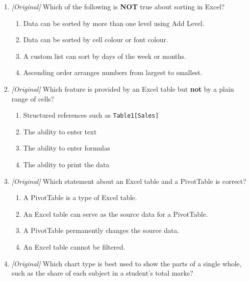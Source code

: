 \documentclass[11pt]{article}
\begin{document}
\begin{enumerate}[label=\textbf{Q\arabic*.}, leftmargin=*]
\begin{enumerate}[label=\Alph*.]
    \item permanently deleted from the worksheet
    \item temporarily hidden, but not deleted
    \item moved to a new worksheet
    \item converted into a PivotTable
  \end{enumerate}
\item \textit{[Original]} Which of the following is \textbf{NOT} true about
  sorting in Excel?
  \begin{enumerate}[label=\Alph*.]
    \item Data can be sorted by more than one level using Add Level.
    \item Data can be sorted by cell colour or font colour.
    \item A custom list can sort by days of the week or months.
    \item Ascending order arranges numbers from largest to smallest.
  \end{enumerate}
\item \textit{[Original]} Which feature is provided by an Excel table but
  \textbf{not} by a plain range of cells?
  \begin{enumerate}[label=\Alph*.]
    \item Structured references such as \texttt{Table1[Sales]}
    \item The ability to enter text
    \item The ability to enter formulas
    \item The ability to print the data
  \end{enumerate}
\item \textit{[Original]} Which statement about an Excel table and a PivotTable
  is correct?
  \begin{enumerate}[label=\Alph*.]
    \item A PivotTable is a type of Excel table.
    \item An Excel table can serve as the source data for a PivotTable.
    \item A PivotTable permanently changes the source data.
    \item An Excel table cannot be filtered.
  \end{enumerate}
\item \textit{[Original]} Which chart type is best used to show the parts of a
  single whole, such as the share of each subject in a student's total marks?
  \begin{enumerate}[label=\Alph*.]

\end{enumerate}
\end{enumerate}
\end{document}
